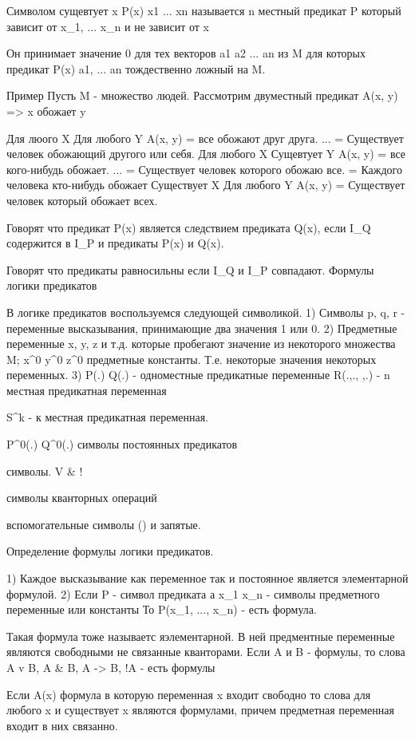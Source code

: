 Символом сущевтует x P(x) x1 ... xn называется n местный предикат P который зависит от x_1, ... x_n и не зависит от x

Он принимает значение 0 для тех векторов a1 a2 ... an из M для которых предикат P(x) a1, ... an тождественно ложный на M.




Пример
Пусть M - множество людей. Рассмотрим двуместный предикат A(x, y) => x обожает y

Для люого X Для любого Y A(x, y) = все обожают друг друга.
... = Существует человек обожающий другого или себя.
Для любого X Сущевтует Y A(x, y) = все кого-нибудь обожает.
... = Существует человек которого обожаю все.
= Каждого человека кто-нибудь обожает
Существует X Для любого Y A(x, y) = Существует человек который обожает всех.

Говорят что предикат P(x) является следствием предиката Q(x), если
I_Q содержится в I_P и предикаты P(x) и Q(x).

Говорят что предикаты равносильны если I_Q и I_P совпадают.
Формулы логики предикатов

В логике предикатов воспользуемся следующей символикой.
1) Символы p, q, r - переменные высказывания, принимающие два значения 1 или 0.
2) Предметные переменные x, y, z и т.д. которые пробегают значение из некоторого множества M; x^0 y^0 z^0 предметные константы. Т.е. некоторые значения некоторых переменных.
3) P(.) Q(.) - одноместные предикатные переменные R(.,., ,.) - n местная предикатная переменная

S^k - к местная предикатная переменная.

P^0(.) Q^0(.) символы постоянных предикатов

символы.
V & !

символы кванторных операций


вспомогательные символы
() и запятые.

Определение формулы логики предикатов.

1) Каждое высказывание как переменное так и постоянное является элементарной формулой.
2) Если P - символ предиката а x_1 x_n - символы предметного переменные или константы
То P(x_1, ..., x_n) - есть формула.

Такая формула тоже называетс яэлементарной. В ней предментные переменные являются свободными не связанные кванторами.
Если A и B - формулы, то слова A v B, A & B, A -> B, !A - есть формулы

Если A(x) формула в которую переменная x входит свободно то слова для любого x и существует x являются формулами, причем предметная переменная входит в них связанно.

